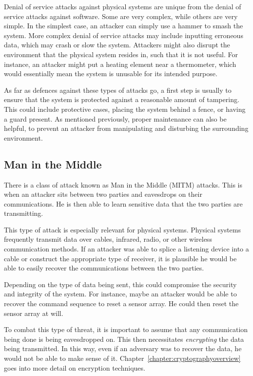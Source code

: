 Denial of service attacks against physical systems are unique from the denial of service attacks against software. Some are very complex,
while others are very simple. In the simplest case, an attacker can simply use a hammer to smash the system. More complex denial of
service attacks may include inputting erroneous data, which may crash or slow the system. Attackers might also disrupt the environment
that the physical system resides in, such that it is not useful. For instance, an attacker might put a heating element near a thermometer,
which would essentially mean the system is unusable for its intended purpose.

As far as defences against these types of attacks go, a first step is usually to ensure that the system is protected against a reasonable
amount of tampering. This could include protective cases, placing the system behind a fence, or having a guard present. As mentioned
previously, proper maintenance can also be helpful, to prevent an attacker from manipulating and disturbing the surrounding
environment.

\subsection{Man in the Middle}
There is a class of attack known as Man in the Middle (MITM) attacks. This is when an attacker sits between two parties and eavesdrops
on their communications. He is then able to learn sensitive data that the two parties are transmitting.

This type of attack is especially relevant for physical systems. Physical systems frequently transmit data over cables, infrared, radio, or
other wireless communication methods. If an attacker was able to splice a listening device into a cable or construct the appropriate type
of receiver, it is plausible he would be able to easily recover the communications between the two parties. 

Depending on the type of data
being sent, this could compromise the security and integrity of the system. For instance, maybe an attacker would be able to recover the
command sequence to reset a sensor array. He could then reset the sensor array at will.

To combat this type of threat, it is important to assume that any communication being done is being eavesdropped on. This then
necessitates \textit{encrypting} the data being transmitted. In this way, even if an adversary was to recover the data, he would not be
able to make sense of it. Chapter~\ref{chapter:cryptographyoverview} goes into more detail on encryption techniques.

